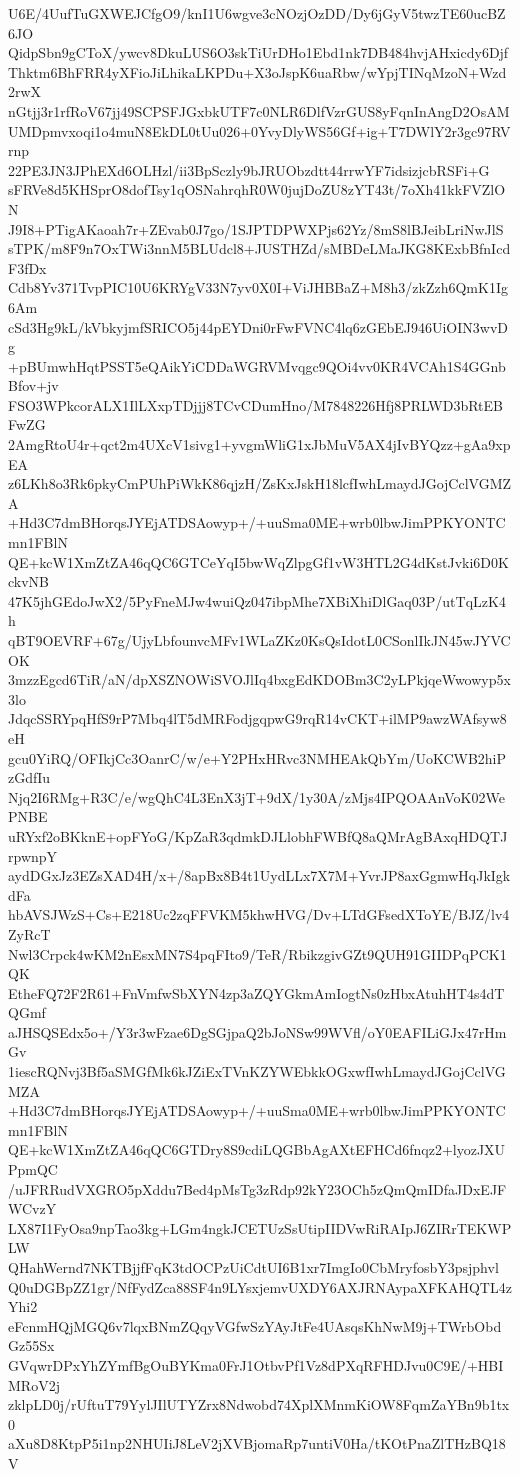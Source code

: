 U6E/4UufTuGXWEJCfgO9/knI1U6wgve3cNOzjOzDD/Dy6jGyV5twzTE60ucBZ6JO
QidpSbn9gCToX/ywcv8DkuLUS6O3skTiUrDHo1Ebd1nk7DB484hvjAHxicdy6Djf
Thktm6BhFRR4yXFioJiLhikaLKPDu+X3oJspK6uaRbw/wYpjTINqMzoN+Wzd2rwX
nGtjj3r1rfRoV67jj49SCPSFJGxbkUTF7c0NLR6DlfVzrGUS8yFqnInAngD2OsAM
UMDpmvxoqi1o4muN8EkDL0tUu026+0YvyDlyWS56Gf+ig+T7DWlY2r3gc97RVrnp
22PE3JN3JPhEXd6OLHzl/ii3BpSczly9bJRUObzdtt44rrwYF7idsizjcbRSFi+G
sFRVe8d5KHSprO8dofTsy1qOSNahrqhR0W0jujDoZU8zYT43t/7oXh41kkFVZlON
J9I8+PTigAKaoah7r+ZEvab0J7go/1SJPTDPWXPjs62Yz/8mS8lBJeibLriNwJlS
sTPK/m8F9n7OxTWi3nnM5BLUdcl8+JUSTHZd/sMBDeLMaJKG8KExbBfnIcdF3fDx
Cdb8Yv371TvpPIC10U6KRYgV33N7yv0X0I+ViJHBBaZ+M8h3/zkZzh6QmK1Ig6Am
cSd3Hg9kL/kVbkyjmfSRICO5j44pEYDni0rFwFVNC4lq6zGEbEJ946UiOIN3wvDg
+pBUmwhHqtPSST5eQAikYiCDDaWGRVMvqgc9QOi4vv0KR4VCAh1S4GGnbBfov+jv
FSO3WPkcorALX1IlLXxpTDjjj8TCvCDumHno/M7848226Hfj8PRLWD3bRtEBFwZG
2AmgRtoU4r+qct2m4UXcV1sivg1+yvgmWliG1xJbMuV5AX4jIvBYQzz+gAa9xpEA
z6LKh8o3Rk6pkyCmPUhPiWkK86qjzH/ZsKxJskH18lcfIwhLmaydJGojCclVGMZA
+Hd3C7dmBHorqsJYEjATDSAowyp+/+uuSma0ME+wrb0lbwJimPPKYONTCmn1FBlN
QE+kcW1XmZtZA46qQC6GTCeYqI5bwWqZlpgGf1vW3HTL2G4dKstJvki6D0KckvNB
47K5jhGEdoJwX2/5PyFneMJw4wuiQz047ibpMhe7XBiXhiDlGaq03P/utTqLzK4h
qBT9OEVRF+67g/UjyLbfounvcMFv1WLaZKz0KsQsIdotL0CSonlIkJN45wJYVCOK
3mzzEgcd6TiR/aN/dpXSZNOWiSVOJlIq4bxgEdKDOBm3C2yLPkjqeWwowyp5x3lo
JdqcSSRYpqHfS9rP7Mbq4lT5dMRFodjgqpwG9rqR14vCKT+ilMP9awzWAfsyw8eH
gcu0YiRQ/OFIkjCc3OanrC/w/e+Y2PHxHRvc3NMHEAkQbYm/UoKCWB2hiPzGdfIu
Njq2I6RMg+R3C/e/wgQhC4L3EnX3jT+9dX/1y30A/zMjs4IPQOAAnVoK02WePNBE
uRYxf2oBKknE+opFYoG/KpZaR3qdmkDJLlobhFWBfQ8aQMrAgBAxqHDQTJrpwnpY
aydDGxJz3EZsXAD4H/x+/8apBx8B4t1UydLLx7X7M+YvrJP8axGgmwHqJkIgkdFa
hbAVSJWzS+Cs+E218Uc2zqFFVKM5khwHVG/Dv+LTdGFsedXToYE/BJZ/lv4ZyRcT
Nwl3Crpck4wKM2nEsxMN7S4pqFIto9/TeR/RbikzgivGZt9QUH91GIIDPqPCK1QK
EtheFQ72F2R61+FnVmfwSbXYN4zp3aZQYGkmAmIogtNs0zHbxAtuhHT4s4dTQGmf
aJHSQSEdx5o+/Y3r3wFzae6DgSGjpaQ2bJoNSw99WVfl/oY0EAFILiGJx47rHmGv
1iescRQNvj3Bf5aSMGfMk6kJZiExTVnKZYWEbkkOGxwfIwhLmaydJGojCclVGMZA
+Hd3C7dmBHorqsJYEjATDSAowyp+/+uuSma0ME+wrb0lbwJimPPKYONTCmn1FBlN
QE+kcW1XmZtZA46qQC6GTDry8S9cdiLQGBbAgAXtEFHCd6fnqz2+lyozJXUPpmQC
/uJFRRudVXGRO5pXddu7Bed4pMsTg3zRdp92kY23OCh5zQmQmIDfaJDxEJFWCvzY
LX87I1FyOsa9npTao3kg+LGm4ngkJCETUzSsUtipIIDVwRiRAIpJ6ZIRrTEKWPLW
QHahWernd7NKTBjjfFqK3tdOCPzUiCdtUI6B1xr7ImgIo0CbMryfosbY3psjphvl
Q0uDGBpZZ1gr/NfFydZca88SF4n9LYsxjemvUXDY6AXJRNAypaXFKAHQTL4zYhi2
eFcnmHQjMGQ6v7lqxBNmZQqyVGfwSzYAyJtFe4UAsqsKhNwM9j+TWrbObdGz55Sx
GVqwrDPxYhZYmfBgOuBYKma0FrJ1OtbvPf1Vz8dPXqRFHDJvu0C9E/+HBIMRoV2j
zklpLD0j/rUftuT79YylJIlUTYZrx8Ndwobd74XplXMnmKiOW8FqmZaYBn9b1tx0
aXu8D8KtpP5i1np2NHUIiJ8LeV2jXVBjomaRp7untiV0Ha/tKOtPnaZlTHzBQ18V
